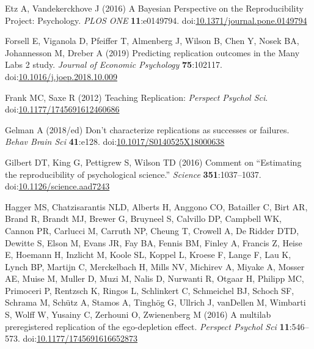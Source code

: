\documentclass[
  english,
  a4paper,
]{article}
\newlength{\cslhangindent}
\newlength{\cslentryspacingunit} %
\newenvironment{CSLReferences}[2] %
 {%
  \setlength{\parindent}{0pt}
  \ifodd #1
  \let\oldpar\par
  \def\par{\hangindent=\cslhangindent\oldpar}
  \fi
  \setlength{\parskip}{#2\cslentryspacingunit}
 }%
 {}
\begin{document}
\begin{CSLReferences}{1}{0}
\leavevmode{}%
Etz A, Vandekerckhove J (2016) A {Bayesian Perspective} on the {Reproducibility Project}: {Psychology}. \emph{PLOS ONE} \textbf{11}:e0149794. doi:\href{https://doi.org/10.1371/journal.pone.0149794}{10.1371/journal.pone.0149794}

\leavevmode{}%
Forsell E, Viganola D, Pfeiffer T, Almenberg J, Wilson B, Chen Y, Nosek BA, Johannesson M, Dreber A (2019) Predicting replication outcomes in the {Many Labs} 2 study. \emph{Journal of Economic Psychology} \textbf{75}:102117. doi:\href{https://doi.org/10.1016/j.joep.2018.10.009}{10.1016/j.joep.2018.10.009}

\leavevmode{}%
Frank MC, Saxe R (2012) Teaching {Replication}: \emph{Perspect Psychol Sci}. doi:\href{https://doi.org/10.1177/1745691612460686}{10.1177/1745691612460686}

\leavevmode{}%
Gelman A (2018/ed) Don't characterize replications as successes or failures. \emph{Behav Brain Sci} \textbf{41}:e128. doi:\href{https://doi.org/10.1017/S0140525X18000638}{10.1017/S0140525X18000638}

\leavevmode{}%
Gilbert DT, King G, Pettigrew S, Wilson TD (2016) Comment on {``{Estimating} the reproducibility of psychological science.''} \emph{Science} \textbf{351}:1037--1037. doi:\href{https://doi.org/10.1126/science.aad7243}{10.1126/science.aad7243}

\leavevmode{}%
Hagger MS, Chatzisarantis NLD, Alberts H, Anggono CO, Batailler C, Birt AR, Brand R, Brandt MJ, Brewer G, Bruyneel S, Calvillo DP, Campbell WK, Cannon PR, Carlucci M, Carruth NP, Cheung T, Crowell A, De Ridder DTD, Dewitte S, Elson M, Evans JR, Fay BA, Fennis BM, Finley A, Francis Z, Heise E, Hoemann H, Inzlicht M, Koole SL, Koppel L, Kroese F, Lange F, Lau K, Lynch BP, Martijn C, Merckelbach H, Mills NV, Michirev A, Miyake A, Mosser AE, Muise M, Muller D, Muzi M, Nalis D, Nurwanti R, Otgaar H, Philipp MC, Primoceri P, Rentzsch K, Ringos L, Schlinkert C, Schmeichel BJ, Schoch SF, Schrama M, Schütz A, Stamos A, Tinghög G, Ullrich J, vanDellen M, Wimbarti S, Wolff W, Yusainy C, Zerhouni O, Zwienenberg M (2016) A multilab preregistered replication of the ego-depletion effect. \emph{Perspect Psychol Sci} \textbf{11}:546--573. doi:\href{https://doi.org/10.1177/1745691616652873}{10.1177/1745691616652873}


\end{CSLReferences}
\end{document}
